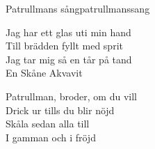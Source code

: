 \begin{song}{Patrullmans sång}{patrullmanssang}
\begin{vers}
Jag har ett glas uti min hand\\
Till brädden fyllt med sprit\\
Jag tar mig så en tår på tand\\
En Skåne Akvavit\\
\end{vers}
\begin{vers}
Patrullman, broder, om du vill\\
Drick ur tills du blir nöjd\\
Skåla sedan alla till\\
I gamman och i fröjd\\
\end{vers}
\end{song}
